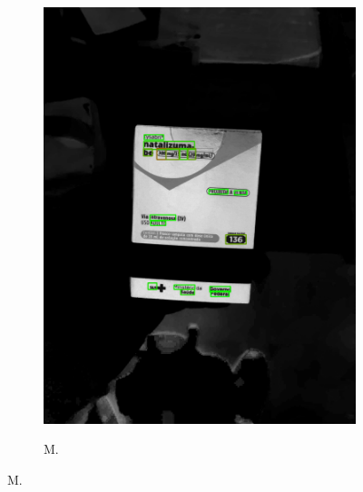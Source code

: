 \begin{figure}[htb]
\begin{subfigure}[t]{0.21\textwidth}
        \includegraphics[width=\linewidth]{../pictures/tysabri_cmyk_c_only_boxes.jpg}
    \end{subfigure}
    \hfill
    \begin{subfigure}[t]{0.21\textwidth}
        \centering
        \caption{M.}
        \label{fig:foto:versoes:2:M:boxes}

\end{subfigure}
\end{figure}
